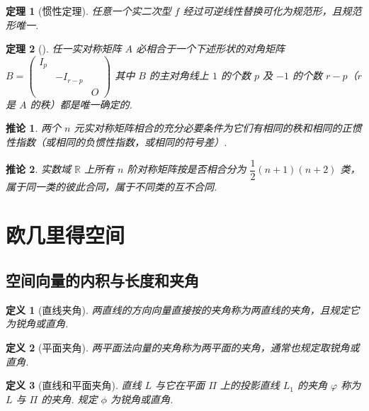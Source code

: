 \documentclass[zihao=-4,UTF8,linespread=1.8,nothm]{aytony_base}
\newtheorem{theorem}{\indent 定理}[subsection]
\newtheorem*{corollary}{\indent 推论}
\newtheorem{definition}{\indent 定义}[subsection]
\begin{document}
\begin{theorem}[惯性定理]
    任意一个实二次型 $f$ 经过可逆线性替换可化为规范形，且规范形唯一.
\end{theorem}

\begin{theorem}[]
    任一实对称矩阵 $A$ 必相合于一个下述形状的对角矩阵 $B = \left(
        \begin{matrix}
                I_p &          &   \\
                    & -I_{r-p} &   \\
                    &          & O
            \end{matrix}
        \right)$ 其中 $B$ 的主对角线上 $1$ 的个数 $p$ 及 $-1$ 的个数 $r-p$（$r$ 是 $A$ 的秩）都是唯一确定的.
\end{theorem}

\begin{corollary}
    两个 $n$ 元实对称矩阵相合的充分必要条件为它们有相同的秩和相同的正惯性指数（或相同的负惯性指数，或相同的符号差）.
\end{corollary}

\begin{corollary}
    实数域 $\mathbb{R}$ 上所有 $n$ 阶对称矩阵按是否相合分为 $\dfrac{1}{2}(n+1)(n+2)$ 类，属于同一类的彼此合同，属于不同类的互不合同.
\end{corollary}

\section{欧几里得空间}

\subsection{空间向量的内积与长度和夹角}

\begin{definition}[直线夹角]
    两直线的方向向量直接按的夹角称为两直线的夹角，且规定它为锐角或直角.
\end{definition}

\begin{definition}[平面夹角]
    两平面法向量的夹角称为两平面的夹角，通常也规定取锐角或直角.
\end{definition}

\begin{definition}[直线和平面夹角]
    直线 $L$ 与它在平面 $\Pi$ 上的投影直线 $L_1$ 的夹角 $\varphi$ 称为 $L$ 与 $\Pi$ 的夹角. 规定 $\phi$ 为锐角或直角.
\end{definition}
\end{document}
